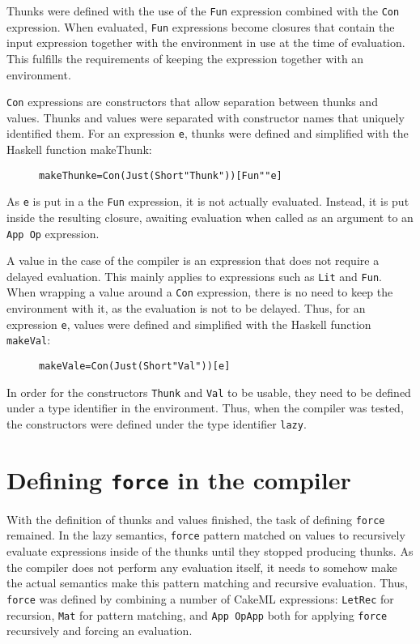 Thunks were defined with the use of the \texttt{Fun} expression combined
with the \texttt{Con} expression. When evaluated, \texttt{Fun} expressions
become closures that contain the input expression together with the environment
in use at the time of evaluation. This fulfills the requirements of keeping
the expression together with an environment.

\texttt{Con} expressions are constructors that allow separation between thunks
and values. Thunks and values were separated with constructor names that
uniquely identified them. For an expression \texttt{e}, thunks were defined and
simplified with the Haskell function makeThunk:

\begin{figure}[H]
\begin{alltt}
  makeThunk e = Con (Just (Short "Thunk")) [Fun "" e]
\end{alltt}
\end{figure}

\noindent As \texttt{e} is put in a the \texttt{Fun} expression, it is not
actually evaluated. Instead, it is put inside the resulting closure, awaiting
evaluation when called as an argument to an \texttt{App Op} expression.

A value in the case of the compiler is an expression that does not require
a delayed evaluation. This mainly applies to expressions such as \texttt{Lit}
and \texttt{Fun}. When wrapping a value around a \texttt{Con} expression, there
is no need to keep the environment with it, as the evaluation is not to be
delayed. Thus, for an expression \texttt{e}, values were defined and simplified
with the Haskell function \texttt{makeVal}:

\begin{figure}[H]
\begin{alltt}
  makeVal e = Con (Just (Short "Val")) [e]
\end{alltt}
\end{figure}

In order for the constructors \texttt{Thunk} and \texttt{Val} to be usable,
they need to be defined under a type identifier in the environment. Thus,
when the compiler was tested, the constructors were defined under the type
identifier \texttt{lazy}.

\section{Defining \texttt{force} in the compiler}
With the definition of thunks and values finished, the task of defining
\texttt{force} remained. In the lazy semantics, \texttt{force} pattern
matched on values to recursively evaluate expressions inside of the thunks until
they stopped producing thunks. As the compiler does not perform any evaluation
itself, it needs to somehow make the actual semantics make this pattern matching
and recursive evaluation. Thus, \texttt{force} was defined by combining a number
of CakeML expressions: \texttt{LetRec} for recursion, \texttt{Mat} for pattern
matching, and \texttt{App OpApp} both for applying \texttt{force} recursively
and forcing an evaluation.

